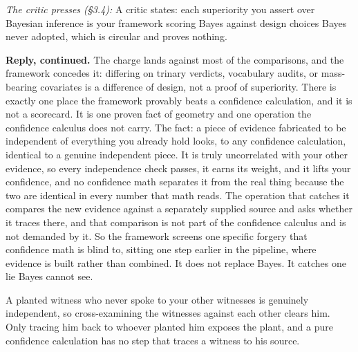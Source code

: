 \documentclass[10pt,twocolumn]{article}
\begin{document}
\emph{The critic presses (§3.4):} A critic states: each superiority you
assert over Bayesian inference is your framework scoring Bayes against
design choices Bayes never adopted, which is circular and proves
nothing.

\textbf{Reply, continued.} The charge lands against most of the
comparisons, and the framework concedes it: differing on trinary
verdicts, vocabulary audits, or mass-bearing covariates is a difference
of design, not a proof of superiority. There is exactly one place the
framework provably beats a confidence calculation, and it is not a
scorecard. It is one proven fact of geometry and one operation the
confidence calculus does not carry. The fact: a piece of evidence
fabricated to be independent of everything you already hold looks, to
any confidence calculation, identical to a genuine independent piece. It
is truly uncorrelated with your other evidence, so every independence
check passes, it earns its weight, and it lifts your confidence, and no
confidence math separates it from the real thing because the two are
identical in every number that math reads. The operation that catches it
compares the new evidence against a separately supplied source and asks
whether it traces there, and that comparison is not part of the
confidence calculus and is not demanded by it. So the framework screens
one specific forgery that confidence math is blind to, sitting one step
earlier in the pipeline, where evidence is built rather than combined.
It does not replace Bayes. It catches one lie Bayes cannot see.

A planted witness who never spoke to your other witnesses is genuinely
independent, so cross-examining the witnesses against each other clears
him. Only tracing him back to whoever planted him exposes the plant, and
a pure confidence calculation has no step that traces a witness to his
source.
\end{document}
